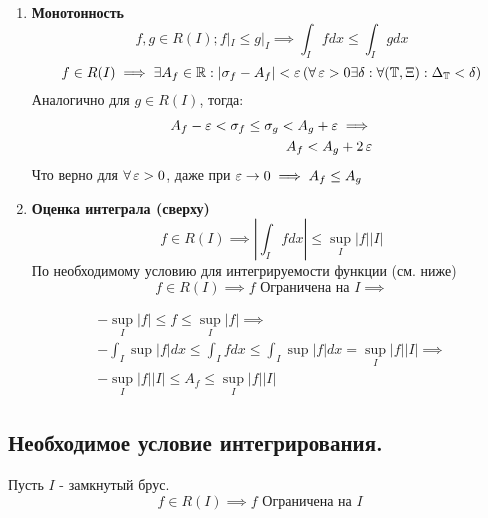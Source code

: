 \documentclass[a4paper, 10pt]{article}
\begin{document}
\begin{enumerate}
\item \textbf{Монотонность}
\begin{equation*}
    f, g\in R(I); f|_I\le g|_I \implies \int_Ifdx \le \int_Igdx
\end{equation*}
\proof
    \begin{equation*}
        f\in R(I) \implies \exists A_f\in \operatorname{\mathbb{R}} : |\sigma_f - A_f| < \operatorname{\varepsilon}\, (\forall \operatorname{\varepsilon} > 0 \exists\delta: \forall(\operatorname{\mathbb{T}}, \Xi): \Delta_{\operatorname{\mathbb{T}}} < \delta)
    \end{equation*}
    Аналогично для $g\in R(I)$, тогда:
    \begin{equation*}
    \begin{aligned}
        A_f - \operatorname{\varepsilon} < \sigma_f \le \sigma_g < A_g + \operatorname{\varepsilon} \implies\\
        A_f < A_g + 2\operatorname{\varepsilon} 
    \end{aligned}
    \end{equation*}
    Что верно для $\forall \operatorname{\varepsilon} > 0$, даже при $\operatorname{\varepsilon} \to 0 \implies A_f \le A_g$
\QED
\item \textbf{Оценка интеграла (сверху)}
\begin{equation*}
    f\in R(I) \implies \left|\int_Ifdx\right| \le \underset{I}{\sup}|f||I|
\end{equation*}
\proof
По необходимому условию для интегрируемости функции (см. ниже)
\begin{equation*}
    f\in R(I) \implies f \text{ Ограничена на } I \implies
\end{equation*}

\begin{equation*}
    \begin{aligned}
        -\sup_I|f| \le f \le \sup_I|f| \implies\\
        -\int_I\sup|f|dx \le \int_Ifdx\le \int_I\sup|f|dx = \sup_I|f||I| \implies\\
        -\sup_I|f||I| \le A_f \le \sup_I|f||I|
    \end{aligned}
\end{equation*}
\QED
\end{enumerate}

\subsection{\theorem Необходимое условие интегрирования.}
Пусть $I$ - замкнутый брус. 
\begin{equation*}
    f\in R(I) \implies f \text{ Ограничена на } I
\end{equation*}
\end{document}
